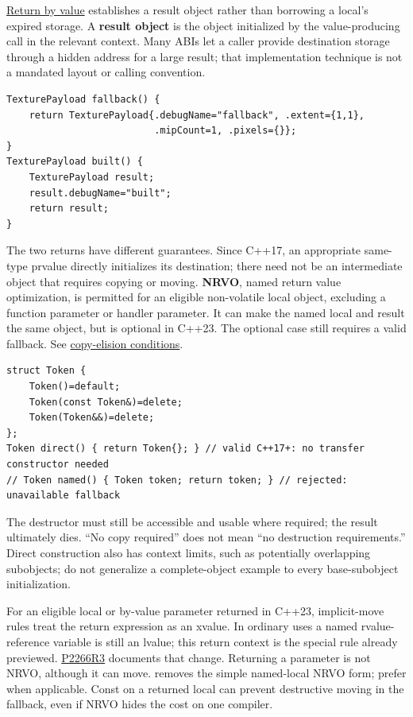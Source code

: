 \hypertarget{01-foundations-i-ch003-return-a-result-without-handing-out-a-lifetime-problem}{}

\hyperref[appendix-b08d3788c5c6]{Return by value} establishes a result object rather than borrowing a local's expired storage. A \textbf{result object} is the object initialized by the value-producing call in the relevant context. Many ABIs let a caller provide destination storage through a hidden address for a large result; that implementation technique is not a mandated layout or calling convention.

\begin{verbatim}
TexturePayload fallback() {
    return TexturePayload{.debugName="fallback", .extent={1,1},
                          .mipCount=1, .pixels={}};
}
TexturePayload built() {
    TexturePayload result;
    result.debugName="built";
    return result;
}
\end{verbatim}

The two returns have different guarantees. Since C++17, an appropriate same-type prvalue directly initializes its destination; there need not be an intermediate object that requires copying or moving. \textbf{NRVO}, named return value optimization, is permitted for an eligible non-volatile local object, excluding a function parameter or handler parameter. It can make the named local and result the same object, but is optional in C++23. The optional case still requires a valid fallback. See \href{https://eel.is/c++draft/class.copy.elision}{copy-elision conditions}.

\begin{verbatim}
struct Token {
    Token()=default;
    Token(const Token&)=delete;
    Token(Token&&)=delete;
};
Token direct() { return Token{}; } // valid C++17+: no transfer constructor needed
// Token named() { Token token; return token; } // rejected: unavailable fallback
\end{verbatim}

The destructor must still be accessible and usable where required; the result ultimately dies. ``No copy required'' does not mean ``no destruction requirements.'' Direct construction also has context limits, such as potentially overlapping subobjects; do not generalize a complete-object example to every base-subobject initialization.

For an eligible local or by-value parameter returned in C++23, implicit-move rules treat the return expression as an xvalue. In ordinary uses a named rvalue-reference variable is still an lvalue; this return context is the special rule already previewed. \href{https://www.open-std.org/jtc1/sc22/wg21/docs/papers/2022/p2266r3.html}{P2266R3} documents that change. Returning a parameter is not NRVO, although it can move.  removes the simple named-local NRVO form; prefer  when applicable. Const on a returned local can prevent destructive moving in the fallback, even if NRVO hides the cost on one compiler.

